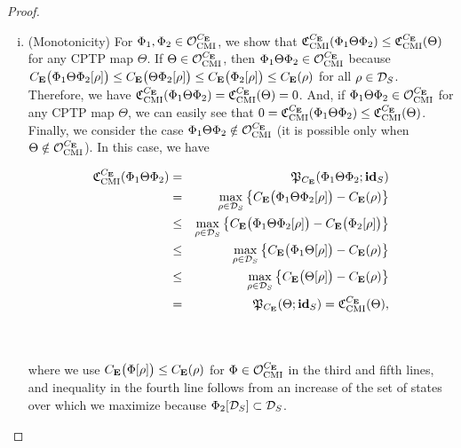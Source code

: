 \documentclass[american,aps,pra,reprint, superscriptaddress]{revtex4-1}
\theoremstyle{plain}
\newcommand{\id}{\mathbf{id}}
\newcommand{\ids}[1]{\id_{#1}}
\def\mCMI{\textmd{CMI}} \def\mI{\textmd{I}} \def\mPI{\textmd{PI}}
\def\fC{\mathfrak{C}}\def\fD{\mathfrak{D}}\def\fF{\mathfrak{F}}\def\fP{\mathfrak{P}}
\theoremstyle{definition}
\theoremstyle{remark}
\begin{document}
\begin{proof}
\begin{enumerate}[(i)]
  \item (Monotonicity) For $\Phi_1, \Phi_2 \in \cO_{\mCMI}^{C_\bE}$, we show that $\fC_{\mCMI}^{C_\bE}(\Phi_1\Theta\Phi_2) \leq \fC_{\mCMI}^{C_\bE}(\Theta)$ for any CPTP map $\Theta$. If $\Theta\in \cO_{\mCMI}^{C_\bE}$, then $\Phi_1\Theta\Phi_2\in \cO_{\mCMI}^{C_\bE}$ because $C_{\mathbf{E}}\big(\Phi_1\Theta\Phi_2[\rho]\big)\leq C_{\mathbf{E}}\big(\Theta\Phi_2[\rho]\big)\leq C_{\mathbf{E}}\big(\Phi_2[\rho]\big)\leq C_{\mathbf{E}}(\rho)$ for all $\rho \in \mathcal{D}_S$. Therefore, we have $\fC_{\mCMI}^{C_\bE}(\Phi_1\Theta\Phi_2) = \fC_{\mCMI}^{C_\bE}(\Theta) = 0$. And, if $\Phi_1\Theta\Phi_2\in\cO_{\mCMI}^{C_\bE}$ for any CPTP map $\Theta$, we can easily see that $0=\fC_{\mCMI}^{C_\bE}(\Phi_1\Theta\Phi_2) \leq \fC_{\mCMI}^{C_\bE}(\Theta)$.
       Finally, we consider the case $\Phi_1\Theta\Phi_2\notin \cO_{\mCMI}^{C_\bE}$  (it is possible only when $\Theta\notin \cO_{\mCMI}^{C_\bE}$). In this case, we have\\
\parbox{6.8cm}{
\begin{eqnarray*}
\fC_{\mCMI}^{C_\bE}(\Phi_1\Theta\Phi_2) &=& \fP_{C_\bE}(\Phi_1\Theta\Phi_2;\ids{S})\\
&=& \max_{\rho\in\cD_S}\big\{C_\bE\big(\Phi_1\Theta\Phi_2[\rho]\big)-C_\bE(\rho)\big\}\\
&\leq& \max_{\rho\in\cD_S}\big\{C_\bE\big(\Phi_1\Theta\Phi_2[\rho]\big)-C_\bE\big(\Phi_2[\rho]\big)\big\}\\
&\leq& \max_{\rho\in\cD_S}\big\{C_\bE\big(\Phi_1\Theta[\rho]\big)-C_\bE(\rho)\big\}\\
&\leq& \max_{\rho\in\cD_S}\big\{C_\bE\big(\Theta[\rho]\big)-C_\bE(\rho)\big\}\\
&=& \fP_{C_\bE}(\Theta;\ids{S}) = \fC_{\mCMI}^{C_\bE}(\Theta),
\end{eqnarray*}}\hfill
\parbox{.3cm}{\begin{eqnarray}\label{eq:the monotonicity of power}\end{eqnarray}}\\
where we use $C_{\mathbf{E}}\big(\Phi[\rho]\big) \leq C_{\mathbf{E}}(\rho)$ for $\Phi \in \cO_{\mCMI}^{C_\bE}$ in the third and fifth lines, and inequality in the fourth line follows from an increase of the set of states over which we maximize because $\Phi_2[\mathcal{D}_S] \subset \mathcal{D}_S$.
\end{enumerate}
\end{proof}

\end{document}
